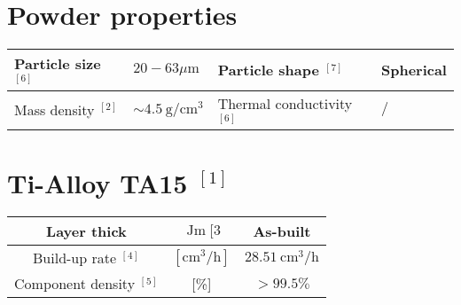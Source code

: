 \documentclass[10pt]{article}
\begin{document}
\section*{Powder properties}
\begin{center}
\begin{tabular}{|l|l|l|l|}
\hline
Particle size ${ }^{[6]}$ & $20-63 \mu \mathrm{m}$ & Particle shape ${ }^{[7]}$ & Spherical \\
\hline
Mass density ${ }^{[2]}$ & $\sim 4.5 \mathrm{~g} / \mathrm{cm}^{3}$ & Thermal conductivity ${ }^{[6]}$ & $/$ \\
\hline
\end{tabular}
\end{center}

\section*{Ti-Alloy TA15 ${ }^{[1]}$}
\begin{center}
\begin{tabular}{|c|c|c|}
\hline
Layer thick & $\operatorname{Jm}[3$ & As-built \\
\hline
Build-up rate ${ }^{[4]}$ & $\left[\mathrm{cm}^{3} / \mathrm{h}\right]$ & $28.51 \mathrm{~cm}^{3} / \mathrm{h}$ \\
\hline
Component density $^{[5]}$ & [\%] & $>99.5 \%$ \\
\hline
\end{tabular}
\end{center}
\end{document}
